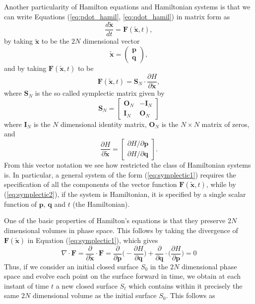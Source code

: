 Another particularity of Hamilton equations and Hamiltonian systems is that we can write Equations (\ref{eq:pdot_hamil},   \ref{eq:qdot_hamil}) in matrix form as
\begin{equation}
\frac{d\tilde{\bm{x}}}{dt}=\bm{F}(\tilde{\bm{x}},t),
\label{eq:symplectic1}
\end{equation}
by taking $\tilde{\bm{x}}$ to be the $2N$ dimensional vector
\begin{equation}
\tilde{\bm{x}}=\begin{pmatrix}
\bm{p}\\
\bm{q}
\end{pmatrix},
\end{equation}
and by taking $\bm{F}(\tilde{\bm{x}},t)$ to be 
\begin{equation}
\bm{F}(\tilde{\bm{x}},t)=\bm{S}_N \cdot \frac{\partial H}{\partial \tilde{\bm{x}}},
\label{eq:symplectic2}
\end{equation}
where $\bm{S}_N$ is the so called symplectic matrix given by 
\begin{equation}
\bm{S}_N=
\begin{bmatrix}
\bm{O}_N & -\bm{I}_N \\
\bm{I}_N & \bm{O}_N
\end{bmatrix}
\label{eq:symplectic_matrix}
\end{equation}
where $\bm{I}_N$ is the $N$ dimensional identity matrix, $\bm{O}_N$ is the $N \times N$ matrix of zeros, and
\begin{equation}
\frac{\partial H}{\partial \tilde{\bm{x}}}=\begin{bmatrix}
\partial H / \partial \bm{p} \\
\partial H / \partial \bm{q}
\end{bmatrix}.
\label{eq:sympl_hamil}
\end{equation}
From this vector notation we see how restricted the class of Hamiltonian systems is. In particular, a general system of the form (\ref{eq:symplectic1}) requires the specification of all the components of the vector function $\bm{F}(\tilde{\bm{x}},t)$, while by (\ref{eq:symplectic2}), if the system is Hamiltonian, it is specified by a single scalar function of $\bm{p}$, $\bm{q}$ and $t$ (the Hamiltonian).\par

One of the basic properties of Hamilton's equations is that they preserve $2N$ dimensional volumes in phase space. This follows by taking the divergence of $\bm{F}(\tilde{\bm{x}})$ in Equation (\ref{eq:symplectic1}), which gives
\begin{equation}
\nabla \cdot \bm{F}=\frac{\partial}{\partial \tilde{\bm{x}}}\cdot \bm{F}=\frac{\partial}{\partial \bm{p}}\Bigg(-\frac{\partial H}{\partial \bm{q}}\Bigg)+\frac{\partial}{\partial \bm{q}}\cdot \Bigg(\frac{\partial H}{\partial \bm{p}}\Bigg)=0
\end{equation}
Thus, if we consider an initial closed surface $S_0$ in the $2N$ dimensional phase space and evolve each point on the surface forward in time, we obtain at each instant of time $t$ a new closed surface $S_t$ which contains within it precisely the same $2N$ dimensional volume as the initial surface $S_0$. This follows as

